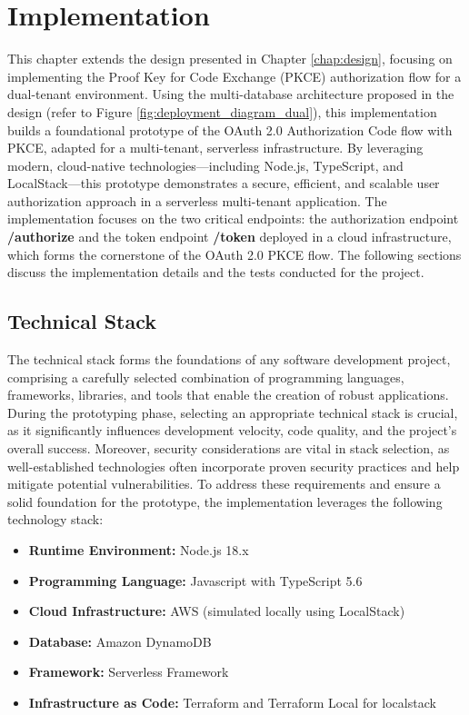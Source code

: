 \chapter{Implementation}

This chapter extends the design presented in Chapter \ref{chap:design}, focusing on implementing the Proof Key for Code Exchange (PKCE) authorization flow for a dual-tenant environment. Using the multi-database architecture proposed in the design (refer to Figure \ref{fig:deployment_diagram_dual}), this implementation builds a foundational prototype of the OAuth 2.0 Authorization Code flow with PKCE, adapted for a multi-tenant, serverless infrastructure. By leveraging modern, cloud-native technologies—including Node.js, TypeScript, and LocalStack—this prototype demonstrates a secure, efficient, and scalable user authorization approach in a serverless multi-tenant application. The implementation focuses on the two critical endpoints: the authorization endpoint \textbf{/authorize} and the token endpoint \textbf{/token} deployed in a cloud infrastructure, which forms the cornerstone of the OAuth 2.0 PKCE flow. The following sections discuss the implementation details and the tests conducted for the project.


\section{Technical Stack}
The technical stack forms the foundations of any software development project, comprising a carefully selected combination of programming languages, frameworks, libraries, and tools that enable the creation of robust applications. During the prototyping phase, selecting an appropriate technical stack is crucial, as it significantly influences development velocity, code quality, and the project's overall success. Moreover, security considerations are vital in stack selection, as well-established technologies often incorporate proven security practices and help mitigate potential vulnerabilities. To address these requirements and ensure a solid foundation for the prototype, the implementation leverages the following technology stack:

\begin{itemize}
    \item \textbf{Runtime Environment:} Node.js 18.x
    \item \textbf{Programming Language:} Javascript with TypeScript 5.6
    \item \textbf{Cloud Infrastructure:} AWS (simulated locally using LocalStack)
    \item \textbf{Database:} Amazon DynamoDB
    \item \textbf{Framework:} Serverless Framework
    \item \textbf{Infrastructure as Code:} Terraform and Terraform Local for localstack

\end{itemize}

